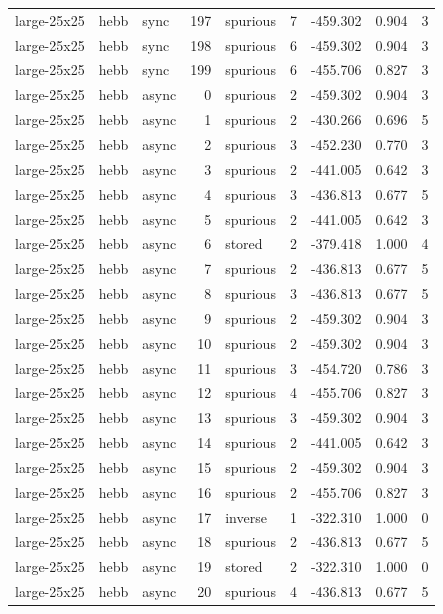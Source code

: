 \begin{tabular}{lllrlrrrr}
large-25x25 & hebb & sync & 197 & spurious & 7 & -459.302 & 0.904 & 3 \\
large-25x25 & hebb & sync & 198 & spurious & 6 & -459.302 & 0.904 & 3 \\
large-25x25 & hebb & sync & 199 & spurious & 6 & -455.706 & 0.827 & 3 \\
large-25x25 & hebb & async & 0 & spurious & 2 & -459.302 & 0.904 & 3 \\
large-25x25 & hebb & async & 1 & spurious & 2 & -430.266 & 0.696 & 5 \\
large-25x25 & hebb & async & 2 & spurious & 3 & -452.230 & 0.770 & 3 \\
large-25x25 & hebb & async & 3 & spurious & 2 & -441.005 & 0.642 & 3 \\
large-25x25 & hebb & async & 4 & spurious & 3 & -436.813 & 0.677 & 5 \\
large-25x25 & hebb & async & 5 & spurious & 2 & -441.005 & 0.642 & 3 \\
large-25x25 & hebb & async & 6 & stored & 2 & -379.418 & 1.000 & 4 \\
large-25x25 & hebb & async & 7 & spurious & 2 & -436.813 & 0.677 & 5 \\
large-25x25 & hebb & async & 8 & spurious & 3 & -436.813 & 0.677 & 5 \\
large-25x25 & hebb & async & 9 & spurious & 2 & -459.302 & 0.904 & 3 \\
large-25x25 & hebb & async & 10 & spurious & 2 & -459.302 & 0.904 & 3 \\
large-25x25 & hebb & async & 11 & spurious & 3 & -454.720 & 0.786 & 3 \\
large-25x25 & hebb & async & 12 & spurious & 4 & -455.706 & 0.827 & 3 \\
large-25x25 & hebb & async & 13 & spurious & 3 & -459.302 & 0.904 & 3 \\
large-25x25 & hebb & async & 14 & spurious & 2 & -441.005 & 0.642 & 3 \\
large-25x25 & hebb & async & 15 & spurious & 2 & -459.302 & 0.904 & 3 \\
large-25x25 & hebb & async & 16 & spurious & 2 & -455.706 & 0.827 & 3 \\
large-25x25 & hebb & async & 17 & inverse & 1 & -322.310 & 1.000 & 0 \\
large-25x25 & hebb & async & 18 & spurious & 2 & -436.813 & 0.677 & 5 \\
large-25x25 & hebb & async & 19 & stored & 2 & -322.310 & 1.000 & 0 \\
large-25x25 & hebb & async & 20 & spurious & 4 & -436.813 & 0.677 & 5 \\

\end{tabular}
